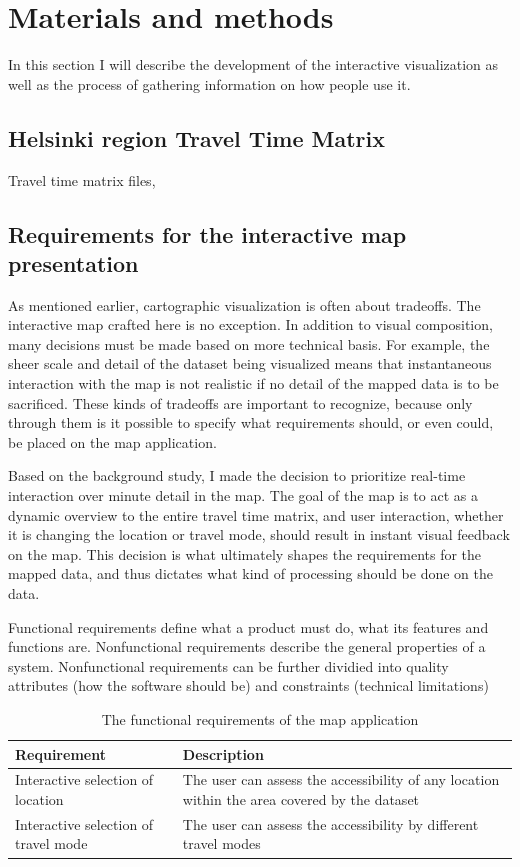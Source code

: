\section{Materials and methods}
In this section I will describe the development of the interactive visualization
as well as the process of gathering information on how people use it.

\subsection{Helsinki region Travel Time Matrix}
Travel time matrix files,

\subsection{Requirements for the interactive map presentation}

As mentioned earlier, cartographic visualization is often about tradeoffs.
The interactive map crafted here is no exception.
In addition to visual composition,  %
many decisions must be made based on more technical basis.
For example, the sheer scale and detail of the dataset being visualized
means that instantaneous interaction with the map is not realistic
if no detail of the mapped data is to be sacrificed.
These kinds of tradeoffs are important to recognize,
because only through them is it possible to specify what
requirements should, or even could, be placed on the map application.

Based on the background study,  %
I made the decision to prioritize real-time interaction over minute detail in the map.
The goal of the map is to act as a dynamic overview to the entire travel time matrix,
and user interaction, whether it is changing the location or travel mode,
should result in instant visual feedback on the map.
This decision is what ultimately shapes the requirements for the mapped data,
and thus dictates what kind of processing should be done on the data.

Functional requirements define what a product must do,
what its features and functions are.
Nonfunctional requirements describe the general properties of a system.
Nonfunctional requirements can be further dividied into quality attributes
(how the software should be) and constraints (technical limitations)

\begin{table}[h]
	\centering
	\begin{tabular}{ | L{0.3\textwidth} | L{0.6\textwidth} | }
		\hline
		Requirement
		& Description
		\\
		\hline
		\hline
		Interactive selection of location
		& The user can assess the accessibility of any location within the area covered by the dataset
		\\
		\hline
		Interactive selection of travel mode
		& The user can assess the accessibility by different travel modes
		\\
		\hline
	\end{tabular}
	\caption{The functional requirements of the map application}
	\label{tab:functional requirements}
\end{table}

